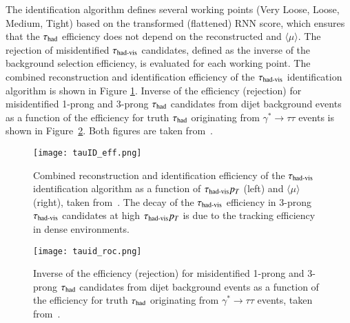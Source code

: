         The identification algorithm defines several working points (Very Loose, Loose, Medium, Tight) based on the 
        transformed (flattened) RNN score, which ensures that the $\tau_{\text{had}}$ efficiency does not depend 
        on the reconstructed \tauhadvis \pT and \(\langle \mu \rangle\). The rejection of misidentified 
        $\tau_{\text{had-vis}}$ candidates, defined as the inverse of the background selection efficiency, is evaluated 
        for each working point. The combined reconstruction and identification efficiency of the $\tau_{\text{had-vis}}$
        identification algorithm is shown in Figure \ref{fig:tau_id_eff}. 
        Inverse of the efficiency (rejection) for misidentified 1-prong and 3-prong $\tau_{\text{had}}$ candidates from dijet
        background events as a function of the efficiency for truth $\tau_{\text{had}}$ originating from $\gamma^*\rightarrow\tau\tau$ 
        events is shown in Figure~\ref{fig:tau_id_roc}. 
        Both figures are taken from~\cite{ATL-PHYS-PUB-2022-044}.
        \begin{figure}[htbp]
            \centering
            \texttt{[image: tauID\_eff.png]}
            \caption{
                Combined reconstruction and identification efficiency of the $\tau_{\text{had-vis}}$ identification algorithm as a 
                function of $\tau_{\text{had-vis}} p_T$ (left) and $\langle \mu \rangle$ (right), taken from~\cite{ATL-PHYS-PUB-2022-044}.
                The decay of the $\tau_{\text{had-vis}}$ efficiency in 3-prong $\tau_{\text{had-vis}}$ candidates at high $\tau_{\text{had-vis}} p_T$ is due to the
                tracking efficiency in dense environments.
            }
            \label{fig:tau_id_eff}
        \end{figure}
        \begin{figure}[htbp]
            \centering
            \texttt{[image: tauid\_roc.png]}
            \caption{
                Inverse of the efficiency (rejection) for misidentified 1-prong and 3-prong $\tau_{\text{had}}$ candidates from dijet
                background events as a function of the efficiency for truth $\tau_{\text{had}}$ originating from $\gamma^*\rightarrow\tau\tau$ events, 
                taken from~\cite{ATL-PHYS-PUB-2022-044}.
            }
            \label{fig:tau_id_roc}
        \end{figure}

